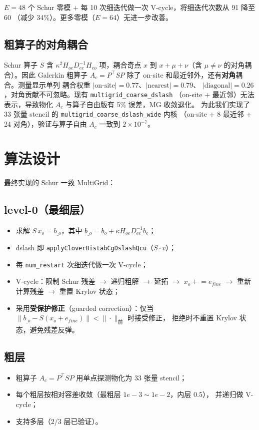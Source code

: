 \documentclass[11pt,a4paper]{article}
\begin{document}
$E=48$ 个 Schur 零模 + 每 10 次细迭代做一次 V-cycle，将细迭代次数从 91 降至 60
（减少 34\%）。更多零模（$E=64$）无进一步改善。

\subsection{粗算子的对角耦合}
\label{sec:diag}

Schur 算子 $S$ 含 $\kappa^2 H_{oe}D_{ee}^{-1}H_{eo}$ 项，耦合奇点 $x$ 到
$x+\mu+\nu$（含 $\mu\ne\nu$ 的对角耦合）。因此 Galerkin 粗算子
$A_c=P^\top S P$ 除了 on-site 和最近邻外，还有\textbf{对角}耦合。测量显示单列
耦合权重 $|\text{on-site}|=0.77$、$|\text{nearest}|=0.79$、
$|\text{diagonal}|=0.26$，对角贡献不可忽略。现有 \texttt{multigrid\_coarse\_dslash}
（on-site + 最近邻）无法表示，导致物化 $A_c$ 与算子自由版有 5\% 误差，MG 收敛退化。
为此我们实现了 33 张量 stencil 的 \texttt{multigrid\_coarse\_dslash\_wide} 内核
（on-site + 8 最近邻 + 24 对角），验证与算子自由 $A_c$ 一致到 $2\times10^{-7}$。

\section{算法设计}
\label{sec:algorithm}

最终实现的 Schur 一致 MultiGrid：

\subsection{level-0（最细层）}
\begin{itemize}
  \item 求解 $S\,x_o=b_{\_o}$，其中 $b_{\_o}=b_o+\kappa H_{oe}D_{ee}^{-1}b_e$；
  \item dslash 即 \texttt{applyCloverBistabCgDslashQcu}（$S\cdot v$）；
  \item 每 \texttt{num\_restart} 次细迭代做一次 V-cycle；
  \item V-cycle：限制 Schur 残差 $\rightarrow$ 递归粗解 $\rightarrow$ 延拓
        $\rightarrow$ $x_o \mathrel{+}= e_{fine}$ $\rightarrow$ 重新计算残差
        $\rightarrow$ 重置 Krylov 状态；
  \item 采用\textbf{受保护修正}（guarded correction）：仅当
        $\|b_{\_o}-S(x_o+e_{fine})\|<\|\cdot\|_{\text{前}}$ 时接受修正，
        拒绝时不重置 Krylov 状态，避免残差反弹。
\end{itemize}

\subsection{粗层}
\begin{itemize}
  \item 粗算子 $A_c=P^\top S P$ 用单点探测物化为 33 张量 stencil；
  \item 每个粗层按相对容差收敛（最粗层 $1e{-}3\sim1e{-}2$，内层 $0.5$），
        并递归做 V-cycle；
  \item 支持多层（2/3 层已验证）。
\end{itemize}
\end{document}
